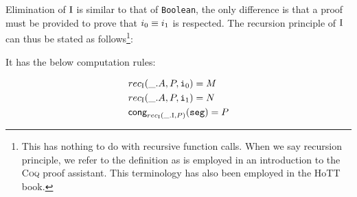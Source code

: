 \documentclass[12pt,twoside,maitrise]{dms}
\theoremstyle{definition}
\numberwithin{equation}{section}
\numberwithin{table}{chapter}
\numberwithin{figure}{chapter}
\newcommand\kw[1] {\textsf{#1}}
\newcommand\id[1] {\texttt{#1}}
\def\Coq{\textsc{Coq}\xspace}
\begin{document}
Elimination of $\mathrm{I}$ is similar to that of \id{Boolean}, the only difference is
that a proof must be provided to prove that $\eqtype{i_0}{i_1}$ is respected.
The recursion principle of $\mathrm{I}$ can thus be stated as follows\footnote{This has
nothing to do with recursive function calls. When we say recursion principle, we
refer to the definition as is employed in an introduction to the \Coq{} proof
assistant\cite{chlipala2022certified}. This terminology has also been employed
in the HoTT book\cite{HoTTbook}.}:

\begin{prooftree*}
\end{prooftree*}

It has the below computation rules:

\begin{align*}
  & rec_{\bI}(\_ . A, P, \ileft) = M \\
  & rec_{\bI}(\_ . A, P, \iright) = N \\
  & \kw{cong}_{rec_{\bI}(\_ . \bI, P)}(\id{seg}) = P
\end{align*}
\end{document}
